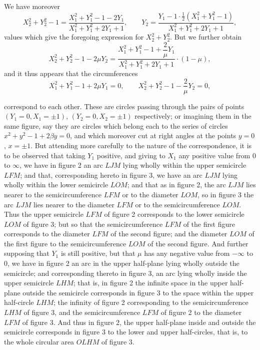 \documentclass[11pt,a4paper]{article}
\begin{document}
We have moreover
\[
X_2^2 + Y_2^2 - 1 = \frac{X_1^2 + Y_1^2 - 1 - 2 Y_1}{X_1^2 + Y_1^2 + 2 Y_1 + 1}, \qquad Y_2 = \frac{Y_1 - 1 \cdot \tfrac{1}{2}(X_1^2 + Y_1^2 - 1)}{X_1^2 + Y_1^2 + 2 Y_1 + 1},
\]
values which give the foregoing expression for $X_2^2 + Y_2^2$. But we further obtain
\[
X_2^2 + Y_2^2 - 1 - 2\mu Y_2 = \frac{X_1^2 + Y_1^2 - 1 + \dfrac{2}{\mu} Y_1}{X_1^2 + Y_1^2 + 2 Y_1 + 1}\cdot(1 - \mu),
\]
and it thus appears that the circumferences
\[
X_1^2 + Y_1^2 - 1 + 2\mu Y_1 = 0, \qquad X_2^2 + Y_2^2 - 1 - \frac{2}{\mu} Y_2 = 0,
\]

correspond to each other. These are circles passing through the pairs of points $(Y_1 = 0, X_1 = \pm 1)$, $(Y_2 = 0, X_2 = \pm 1)$ respectively; or imagining them in the same figure, say they are circles which belong each to the series of circles $x^2 + y^2 - 1 + 2\beta y = 0$, and which moreover cut at right angles at the points $y = 0$, $x = \pm 1$. But attending more carefully to the nature of the correspondence, it is to be observed that taking $Y_1$ positive, and giving to $X_1$ any positive value from 0 to $\infty$, we have in figure 2 an arc $LJM$ lying wholly within the upper semicircle $LFM$; and that, corresponding hereto in figure 3, we have an arc $LJM$ lying wholly within the lower semicircle $LOM$; and that as in figure 2, the arc $LJM$ lies nearer to the semicircumference $LFM$ or to the diameter $LOM$, so in figure 3 the arc $LJM$ lies nearer to the diameter $LFM$ or to the semicircumference $LOM$. Thus the upper semicircle $LFM$ of figure 2 corresponds to the lower semicircle $LOM$ of figure 3; but so that the semicircumference $LFM$ of the first figure corresponds to the diameter $LFM$ of the second figure; and the diameter $LOM$ of the first figure to the semicircumference $LOM$ of the second figure. And further supposing that $Y_1$ is still positive, but that $\mu$ has any negative value from $-\infty$ to 0, we have in figure 2 an arc in the upper half-plane lying wholly outside the semicircle; and corresponding thereto in figure 3, an arc lying wholly inside the upper semicircle $LHM$; that is, in figure 2 the infinite space in the upper half-plane outside the semicircle corresponds in figure 3 to the space within the upper half-circle $LHM$; the infinity of figure 2 corresponding to the semicircumference $LHM$ of figure 3, and the semicircumference $LFM$ of figure 2 to the diameter $LFM$ of figure 3. And thus in figure 2, the upper half-plane inside and outside the semicircle corresponds in figure 3 to the lower and upper half-circles, that is, to the whole circular area $OLHM$ of figure 3.
\end{document}
